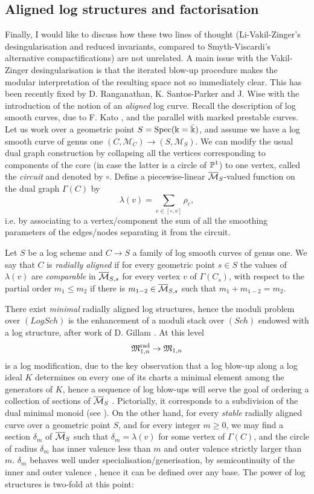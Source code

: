 \subsection{Aligned log structures and factorisation} Finally, I would like to discuss how these two lines of thought (Li-Vakil-Zinger's desingularisation and reduced invariants, compared to Smyth-Viscardi's alternative compactifications) are not unrelated. A main issue with the Vakil-Zinger desingularisation is that the iterated blow-up procedure makes the modular interpretation of the resulting space not so immediately clear. This has been recently fixed by D. Ranganathan, K. Santos-Parker and J. Wise with the introduction of the notion of an \emph{aligned} log curve. Recall the description of log smooth curves, due to F. Kato \cite{KatoF}, and the parallel with marked prestable curves. Let us work over a geometric point $S=\operatorname{Spec}(\Bbbk=\bar{\Bbbk})$, and assume we have a log smooth curve of genus one $(C,\mathcal M_C)\to(S,\mathcal M_S)$. We can modify the usual dual graph construction by collapsing all the vertices corresponding to components of the core (in case the latter is a circle of $\mathbb P^1$) to one vertex, called the \emph{circuit} and denoted by $\circ$. Define a piecewise-linear $\overline{\mathcal{M}}_S$-valued function on the dual graph $\Gamma(C)$ by \[\lambda(v)=\sum_{e\in[\circ,v]}\rho_e,\] i.e. by associating to a vertex/component the sum of all the smoothing parameters of the edges/nodes separating it from the circuit.
\begin{dfn}
 Let $S$ be a log scheme and $C\to S$ a family of log smooth curves of genus one. We say that $C$ is \emph{radially aligned} if for every geometric point $s\in S$ the values of $\lambda(v)$ are \emph{comparable} in $\overline{\mathcal{M}}_{S,s}$ for every vertex $v$ of $\Gamma(C_s)$, with respect to the partial order $m_1\leq m_2$ if there is $m_{1-2}\in\overline{\mathcal{M}}_{S,s}$ such that $m_1+m_{1-2}=m_2$.
\end{dfn}
There exist \emph{minimal} radially aligned log structures, hence the moduli problem over $(LogSch)$ is the enhancement of a moduli stack over $(Sch)$ endowed with a log structure, after work of D. Gillam \cite{Gillam}. At this level
\[\mathfrak M^{\mathrm{rad}}_{1,n}\rightarrow\mathfrak M_{1,n}\]
is a log modification, due to the key observation that a log blow-up along a log ideal $K$ determines on every one of its charts a minimal element among the generators of $K$, hence a sequence of log blow-ups will serve the goal of ordering a collection of sections of $\overline{\mathcal{M}}_S$ \cite[Lemma 3.36]{Kelithesis}. Pictorially, it corresponds to a subdivision of the dual minimal monoid (see \cite[\S 3.3-3.4]{RSPW}). On the other hand, for every \emph{stable} radially aligned curve over a geometric point $S$, and for every integer $m\geq0$, we may find a section $\delta_m$ of $\overline{\mathcal{M}}_S$ such that $\delta_m=\lambda(v)$ for some vertex of $\Gamma(C)$, and the circle of radius $\delta_m$ has inner valence less than $m$ and outer valence strictly larger than $m$. $\delta_m$ behaves well under specialisation/generisation, by semicontinuity of the inner and outer valence \cite[Proposition 3.5.2]{RSPW}, hence it can be defined over any base. The power of log structures is two-fold at this point:
